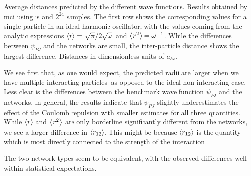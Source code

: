 \documentclass[Thesis.tex]{subfiles}
\begin{document}
\begin{table}[h]
  \centering
  \caption[Radial metrics of different wave functions on quantum dots]{Average distances predicted by the different wave functions. Results
    obtained by \gls{mci} using \gls{is} and $2^{24}$
    samples. The first row shows the corresponding values for a single particle
    in an ideal harmonic oscillator, with the values coming from the analytic
    expressions $\expval{r}=\flatfrac{\sqrt\pi}{2\sqrt\omega}$ and
    $\expval{r^2}=\omega^{-1}$. While the differences between $\psi_{PJ}$ and
    the networks are small, the inter-particle distance shows the largest
    difference. Distances in dimensionless units of $a_{ho}$.}
  
  \label{tab:QD-mean-distance-metrics}
\end{table}
We see first that, as one would expect, the predicted radii are larger when we
have multiple interacting particles, as opposed to the ideal non-interacting
case. Less clear is the differences between the benchmark wave function
$\psi_{PJ}$ and the networks. In general, the results
indicate that $\psi_{PJ}$ slightly underestimates the effect of the Coulomb
repulsion with smaller estimates for all three quantities. While $\expval{r}$
and $\expval{r^2}$ are only borderline significantly different from the networks, we see a
larger difference in $\expval{r_{12}}$. This might
be because $\expval{r_{12}}$ is the quantity which is most directly
connected to the strength of the interaction

The two network types seem to be equivalent, with the observed differences well
within statistical expectations.
\end{document}
